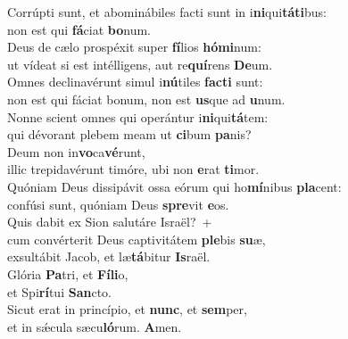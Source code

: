 \evenverse Corrúpti sunt, et abominábiles facti sunt in i\textbf{ni}qui\textbf{tá}\textbf{ti}bus:~\*\\
\evenverse non est qui \textbf{fá}ciat \textbf{bo}num.\\
\oddverse Deus de cælo prospéxit super \textbf{fí}lios \textbf{hó}\textbf{mi}num:~\*\\
\oddverse ut vídeat si est intélligens, aut re\textbf{quí}rens \textbf{De}um.\\
\evenverse Omnes declinavérunt simul i\textbf{nú}tiles \textbf{fa}\textbf{cti} sunt:~\*\\
\evenverse non est qui fáciat bonum, non est \textbf{us}que ad \textbf{u}num.\\
\oddverse Nonne scient omnes qui operántur i\textbf{ni}qui\textbf{tá}tem:~\*\\
\oddverse qui dévorant plebem meam ut \textbf{ci}bum \textbf{pa}nis?\\
\evenverse Deum non in\textbf{vo}ca\textbf{vé}runt,~\*\\
\evenverse illic trepidavérunt timóre, ubi non \textbf{e}rat \textbf{ti}mor.\\
\oddverse Quóniam Deus dissipávit ossa eórum qui ho\textbf{mí}nibus \textbf{pla}cent:~\*\\
\oddverse confúsi sunt, quóniam Deus \textbf{spre}vit \textbf{e}os.\\
\evenverse Quis dabit ex Sion salutáre Israël?~+\\
\evenverse  cum convérterit Deus captivitátem \textbf{ple}bis \textbf{su}æ,~\*\\
\evenverse exsultábit Jacob, et læ\textbf{tá}bitur \textbf{Is}raël.\\
\oddverse Glória \textbf{Pa}tri, et \textbf{Fí}\textbf{li}o,~\*\\
\oddverse et Spi\textbf{rí}tui \textbf{San}cto.\\
\evenverse Sicut erat in princípio, et \textbf{nunc}, et \textbf{sem}per,~\*\\
\evenverse et in sǽcula sæcu\textbf{ló}rum. \textbf{A}men.\\
